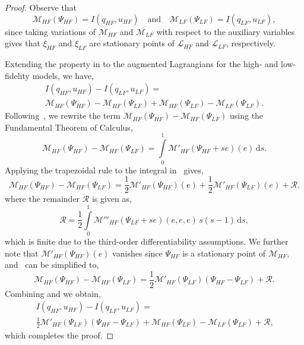 \documentclass[review,sort&compress]{elsarticle}
\begin{document}
\begin{proof}
%
Observe that
%
\begin{equation}
\label{eq:MeqI}
\mathcal{M}_{HF}(\Psi_{HF})=I(q_{HF},u_{HF})\quad\textrm{and}\quad\mathcal{M}_{LF}(\Psi_{LF})=I(q_{LF},u_{LF}),
\end{equation}
%
since taking variations of $\mathcal{M}_{HF}$ and $\mathcal{M}_{LF}$ with respect to the auxiliary variables gives that $\xi_{HF}$ and $\xi_{LF}$ are stationary points of $\mathcal{L}_{HF}$ and $\mathcal{L}_{LF}$, respectively.

Extending the property in  to the augmented Lagrangians for the high- and low-fidelity models, we have,
%
\begin{multline}
\label{eq:repIwithM}
I(q_{HF},u_{HF})-I(q_{LF},u_{LF})=\\\mathcal{M}_{HF}(\Psi_{HF})-\mathcal{M}_{HF}(\Psi_{LF})+\mathcal{M}_{HF}(\Psi_{LF})-\mathcal{M}_{LF}(\Psi_{LF})\textrm{.}
\end{multline}
%
Following~\cite{BecVex05}, we rewrite the term $\mathcal{M}_{HF}(\Psi_{HF})-\mathcal{M}_{HF}(\Psi_{LF})$ using the Fundamental Theorem of Calculus,
%
\begin{equation}
\label{eq:Mantiderivative}
\mathcal{M}_{HF}(\Psi_{HF})-\mathcal{M}_{HF}(\Psi_{LF}) = \int\limits_{0}^{1} \mathcal{M}'_{HF}\left(\Psi_{HF} + se\right)\left(e\right) \, \textrm{d}s.
\end{equation}
%
Applying the trapezoidal rule to the integral in~ gives,
%
\begin{equation}
\label{eq:Mprimetrapezoid}
\mathcal{M}_{HF}(\Psi_{HF})-\mathcal{M}_{HF}(\Psi_{LF}) = \frac{1}{2}\mathcal{M}'_{HF}(\Psi_{HF})(e) + \frac{1}{2}\mathcal{M}'_{HF}(\Psi_{LF})(e) + \mathcal{R}\textrm{.}
\end{equation}
%
where the remainder $\mathcal{R}$ is given as,
%
\begin{equation}
\label{eq:trapezoidremainder}
\mathcal{R} = \frac{1}{2} \int\limits_{0}^{1} \mathcal{M}'''_{HF}\left(\Psi_{LF} + se\right)(e,e,e) \, s(s-1) \, \textrm{d}s,
\end{equation}
%
which is finite due to the third-order differentiability assumptions. We further note that $\mathcal{M}'_{HF}(\Psi_{HF})(e)$ vanishes since $\Psi_{HF}$ is a stationary point of $\mathcal{M}_{HF}$, and~ can be simplified to,
%
\begin{equation}
\label{eq:beckvex}
\mathcal{M}_{HF}(\Psi_{HF})-\mathcal{M}_{HF}(\Psi_{LF}) = \frac{1}{2}\mathcal{M}'_{HF}(\Psi_{LF})(\Psi_{HF}-\Psi_{LF})+\mathcal{R}\textrm{.}
\end{equation}
%
Combining  and  we obtain,
%
\begin{multline}
\label{eq:preadj}
I(q_{HF},u_{HF})-I(q_{LF},u_{LF})=\\\frac{1}{2}\mathcal{M}'_{HF}(\Psi_{LF})(\Psi_{HF}-\Psi_{LF})+\mathcal{M}_{HF}(\Psi_{LF})-\mathcal{M}_{LF}(\Psi_{LF})+\mathcal{R}\textrm{,}
\end{multline}
which completes the proof.
\end{proof}
%
\end{document}
